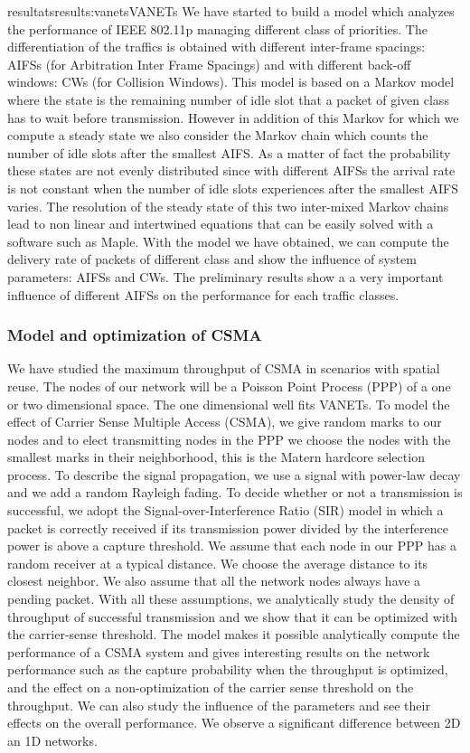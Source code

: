 \documentclass{ra2016}
\begin{document}
\begin{module}{resultats}{results:vanets}{VANETs}
We have started to build a model which analyzes the performance 
of IEEE 802.11p managing different class of priorities. 
The differentiation of the traffics is obtained with different 
inter-frame spacings:  AIFSs (for Arbitration Inter Frame Spacings) and with 
different back-off windows: CWs (for Collision Windows). 
This model is based on a Markov model where the state is the remaining 
number of idle slot that a packet of given class has to wait before transmission. 
However in addition of this Markov for which we compute a steady state 
we also consider the Markov chain which counts the number of idle slots after 
the smallest AIFS. As a matter of fact the probability these states are not evenly 
distributed since with different AIFSs the arrival rate is not constant 
when the number of idle slots experiences after the smallest AIFS varies. 
The resolution of the steady state of this two inter-mixed Markov chains
lead to non linear and intertwined equations that can be easily  solved with a software 
such as Maple. 
With the model we have obtained, we can compute the delivery rate 
of packets of different class and show the influence of system parameters: 
AIFSs and CWs. The preliminary results show a a very important influence 
of different AIFSs on the performance for each traffic classes.  

\subsubsection{Model and optimization of CSMA}

We have studied  the maximum throughput of CSMA in scenarios with spatial reuse.
The nodes of our network will be a Poisson Point Process (PPP) of a one or two dimensional space.
The one dimensional well fits VANETs.
To model the effect of Carrier Sense Multiple Access (CSMA), we give random marks to our nodes and to elect transmitting nodes in the PPP we choose the nodes with the smallest marks in their neighborhood, this is the Matern hardcore selection process.
To describe the signal propagation, we use a signal with power-law decay and we add a random Rayleigh fading.
To decide whether or not a transmission is successful, we adopt the Signal-over-Interference Ratio (SIR) model in which a packet is correctly received if its transmission power divided by the interference power is above a capture threshold.
We assume that each node in our PPP has a random receiver at a typical distance.
We choose the average distance to its closest neighbor.
We also assume that all the network nodes always have a pending packet.
With all these assumptions, we analytically study the density of throughput of successful transmission and we show that it can be optimized with the carrier-sense threshold. 
 The model makes it possible analytically compute the 
 performance of a CSMA system and gives 
 interesting results on the network performance such as the capture probability 
 when the throughput is optimized, and the effect on a non-optimization of the 
 carrier sense threshold on the throughput. We can also study the influence 
of the parameters and  see their effects on the overall performance. 
We observe a significant difference between 2D an 1D networks.



\end{module}
\end{document}
